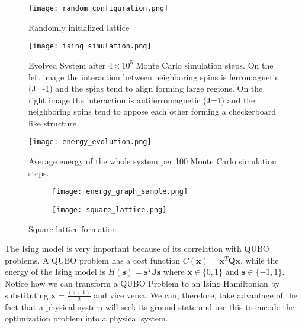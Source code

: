 \documentclass[12pt,a4paper]{report}
\begin{document}
\begin{figure}[!h]
    \centering
    \texttt{[image: random\_configuration.png]}
    \caption{Randomly initialized lattice}
    \label{fig:ising-random-initialization}
\end{figure}

\begin{figure}[!h]
    \centering
    \texttt{[image: ising\_simulation.png]}
    \caption{Evolved System after \(4 \times 10^5\) Monte Carlo simulation steps. On the left image the interaction between neighboring spins is ferromagnetic (J=-1) and the spins tend to align forming large regions. On the right image the interaction is antiferromagnetic (J=1) and the neighboring spins tend to oppose each other forming a checkerboard like structure}
    \label{fig:ising-simulated-result}
\end{figure}

\begin{figure}[H]
    \centering
    \texttt{[image: energy\_evolution.png]}
    \caption{Average energy of the whole system per 100 Monte Carlo simulation steps.}
    \label{fig:ising-energy-evolution}
\end{figure}

\newpage

\begin{figure}[h]
    \begin{subfigure}{0.5\textwidth}
        \centering
        \texttt{[image: energy\_graph\_sample.png]}
    \end{subfigure}
    \begin{subfigure}{0.5\textwidth}
        \centering
        \texttt{[image: square\_lattice.png]}
    \end{subfigure}
    \caption{Square lattice formation}
\end{figure}

\noindent
The Ising model is very important because of its correlation with QUBO problems. A QUBO problem has a cost function \(C(\mathbf{x}) = \mathbf{x}^T\mathbf{Q}\mathbf{x}\), while the energy of the Ising model is \(H(\mathbf{s}) = \mathbf{s}^T\mathbf{J}\mathbf{s}\) where \(\mathbf{x} \in \{0, 1\}\) and \(\mathbf{s} \in \{-1, 1\}\). Notice how we can transform a QUBO Problem to an Ising Hamiltonian by substituting \(\mathbf{x} = \frac{(\mathbf{s}+1)}{2}\) and vice versa. We can, therefore, take advantage of the fact that a physical system will seek its ground state and use this to encode the optimization problem into a physical system. 
\end{document}
